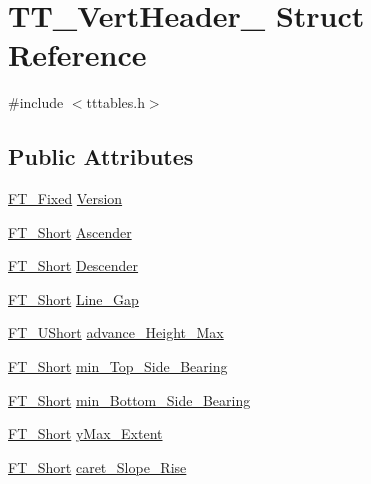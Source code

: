 \hypertarget{struct_t_t___vert_header__}{\section{T\-T\-\_\-\-Vert\-Header\-\_\- Struct Reference}
\label{struct_t_t___vert_header__}
}


{\ttfamily \#include $<$tttables.\-h$>$}

\subsection*{Public Attributes}
\begin{DoxyCompactItemize}
\item 
\hyperlink{fttypes_8h_a5f5a679cc09f758efdd0d1c5feed3c3d}{F\-T\-\_\-\-Fixed} \hyperlink{struct_t_t___vert_header___a32d736621b757e9a39a15f2f82d15b9c}{Version}
\item 
\hyperlink{fttypes_8h_aa7279be89046a2563cd3d4d6651fbdcf}{F\-T\-\_\-\-Short} \hyperlink{struct_t_t___vert_header___afa95848b08d1fc8bd6bfe7e639e2895c}{Ascender}
\item 
\hyperlink{fttypes_8h_aa7279be89046a2563cd3d4d6651fbdcf}{F\-T\-\_\-\-Short} \hyperlink{struct_t_t___vert_header___afeeb8f6c759a76d655f24f1d58f1cf35}{Descender}
\item 
\hyperlink{fttypes_8h_aa7279be89046a2563cd3d4d6651fbdcf}{F\-T\-\_\-\-Short} \hyperlink{struct_t_t___vert_header___a8a6ad9f251e12e6701ebe53d19a65aa5}{Line\-\_\-\-Gap}
\item 
\hyperlink{fttypes_8h_a937f6c17cf5ffd09086d8610c37b9f58}{F\-T\-\_\-\-U\-Short} \hyperlink{struct_t_t___vert_header___a7a2acbd1abd4cc4d6f40110203f99d0f}{advance\-\_\-\-Height\-\_\-\-Max}
\item 
\hyperlink{fttypes_8h_aa7279be89046a2563cd3d4d6651fbdcf}{F\-T\-\_\-\-Short} \hyperlink{struct_t_t___vert_header___a10d78594a56f0966ae1d7b60138fbec2}{min\-\_\-\-Top\-\_\-\-Side\-\_\-\-Bearing}
\item 
\hyperlink{fttypes_8h_aa7279be89046a2563cd3d4d6651fbdcf}{F\-T\-\_\-\-Short} \hyperlink{struct_t_t___vert_header___a21422639a4cfd8dcdc9ebb3795676292}{min\-\_\-\-Bottom\-\_\-\-Side\-\_\-\-Bearing}
\item 
\hyperlink{fttypes_8h_aa7279be89046a2563cd3d4d6651fbdcf}{F\-T\-\_\-\-Short} \hyperlink{struct_t_t___vert_header___af6927e95c1dfbe90c2e76b1eef521d53}{y\-Max\-\_\-\-Extent}
\item 
\hyperlink{fttypes_8h_aa7279be89046a2563cd3d4d6651fbdcf}{F\-T\-\_\-\-Short} \hyperlink{struct_t_t___vert_header___a3218533a7d8ac5a8ebd70a970cbdbbcc}{caret\-\_\-\-Slope\-\_\-\-Rise}

\end{DoxyCompactItemize}

